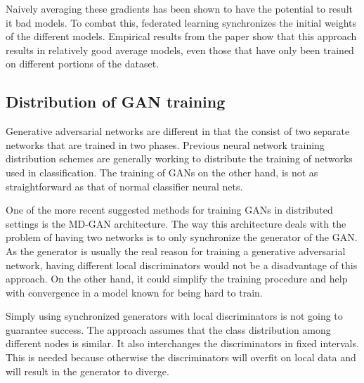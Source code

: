 \documentclass[11pt]{article}       %
\begin{document}
Naively averaging these gradients has been shown to have the potential to result it bad models.\cite{goodfellow2014qualitatively} To combat this, federated learning synchronizes the initial weights of the different models. Empirical results from the paper show that this approach results in relatively good average models, even those that have only been trained on different portions of the dataset.

\subsection{Distribution of GAN training}

Generative adversarial networks are different in that the consist of two separate networks that are trained in two phases. Previous neural network training distribution schemes are generally working to distribute the training of networks used in classification. The training of GANs on the other hand, is not as straightforward as that of normal classifier neural nets.

One of the more recent suggested methods for training GANs in distributed settings is the MD-GAN architecture.\cite{Hardy2019} The way this architecture deals with the problem of having two networks is to only synchronize the generator of the GAN. As the generator is usually the real reason for training a generative adversarial network, having different local discriminators would not be a disadvantage of this approach. On the other hand, it could simplify the training procedure and help with convergence in a model known for being hard to train.

Simply using synchronized generators with local discriminators is not going to guarantee success. The approach assumes that the class distribution among different nodes is similar. It also interchanges the discriminators in fixed intervals. This is needed because otherwise the discriminators will overfit on local data and will result in the generator to diverge.

% 

\printbibliography
\end{document}
